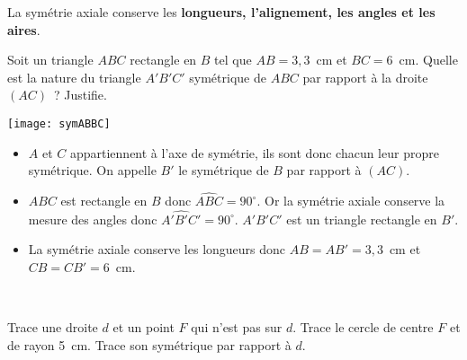 \begin{methode*1}

\begin{aconnaitre}
La symétrie axiale conserve les \textbf{longueurs, l'alignement, les angles et les aires}.
\end{aconnaitre}

\begin{exemple*1}
Soit un triangle $ABC$ rectangle en $B$ tel que $AB = 3,3$ cm et $BC = 6$ cm. Quelle est la nature du triangle $A'B'C'$ symétrique de $ABC$ par rapport à la droite $(AC)$ ? Justifie. \\[0.5em]
\begin{minipage}[c]{0.4\linewidth}
 \texttt{[image: symABBC]} \qquad
 \end{minipage}
 \begin{minipage}[c]{0.56\linewidth}
 \begin{itemize}
  \item $A$ et $C$ appartiennent à l'axe de symétrie, ils sont donc chacun leur propre symétrique. On appelle $B'$ le symétrique de $B$ par rapport à $(AC)$.
  \item $ABC$ est rectangle en $B$ donc $\widehat{ABC} = 90^{\circ}$. Or la symétrie axiale conserve la mesure des angles donc $\widehat{A'B'C'} = 90^{\circ}$. $A'B'C'$ est un triangle rectangle en $B'$.
  \item La symétrie axiale conserve les longueurs donc $AB = AB' = 3,3$ cm et $CB = CB' = 6$ cm.
  \end{itemize}
 \end{minipage} \\
 \end{exemple*1}


\exercice
Trace une droite $d$ et un point $F$ qui n'est pas sur $d$. Trace le cercle de centre $F$ et de rayon 5 cm. Trace son symétrique par rapport à $d$.
 
\end{methode*1}


